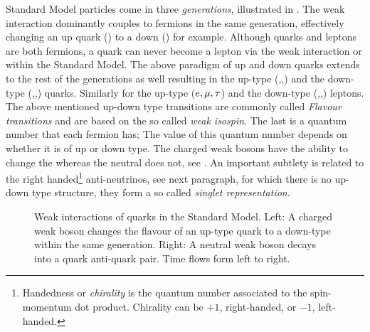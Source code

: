 Standard Model particles come in three {\it generations}, illustrated in .
The weak interaction dominantly couples to fermions in the same generation, effectively changing an up quark (\uquark) to a down (\dquark) for example.
Although quarks and leptons are both fermions, a quark can never become a lepton via the weak interaction or \viceversa within the Standard Model.
The above paradigm of up and down quarks extends to the rest of the generations as well resulting in the up-type (\uquark,\cquark,\tquark)
and the down-type (\dquark,\squark,\bquark) quarks. Similarly for the  up-type ($e,\mu,\tau$) and the down-type (\neue,\neum,\neut)
leptons. The above mentioned up-down type transitions are commonly called {\it Flavour transitions} and are based on the so called
{\it weak isospin}. The last is a quantum number that each fermion has; The value of this quantum number depends on whether it is of up or down type.
The charged weak bosons \Wpm have the ability to change the whereas the neutral \Z  does not, see .
An important subtlety is related to the right handed\footnote{Handedness or {\it chirality} is the quantum number associated to the
spin-momentum dot product. Chirality can be $+1$, right-handed, or $-1$, left-handed. } anti-neutrinos, see next paragraph,
for which there is no up-down type structure, \ie they form a so called {\it singlet representation}.

\begin{figure}[h!]
  \centering
  {\sffamily }
  \caption{Weak interactions of quarks in the Standard Model. Left: A charged weak boson changes the flavour
           of an up-type quark to a down-type within the same generation.
           Right: A neutral weak boson decays into a quark anti-quark pair. Time flows form left to right.}
  \label{WeakInteractions}
\end{figure}

